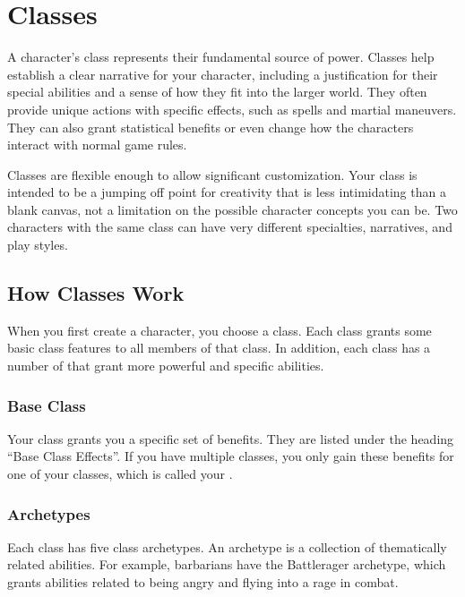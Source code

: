 \chapter{Classes}\label{Classes}

    A character's class represents their fundamental source of power.
    Classes help establish a clear narrative for your character, including a justification for their special abilities and a sense of how they fit into the larger world.
    They often provide unique actions with specific effects, such as spells and martial maneuvers.
    They can also grant statistical benefits or even change how the characters interact with normal game rules.

    Classes are flexible enough to allow significant customization.
    Your class is intended to be a jumping off point for creativity that is less intimidating than a blank canvas, not a limitation on the possible character concepts you can be.
    Two characters with the same class can have very different specialties, narratives, and play styles.

\section{How Classes Work}
    When you first create a character, you choose a class.
    Each class grants some basic class features to all members of that class.
    In addition, each class has a number of  that grant more powerful and specific abilities.

    \subsection{Base Class}\label{Base Class}
        Your class grants you a specific set of benefits.
        They are listed under the heading ``Base Class Effects''.
        If you have multiple classes, you only gain these benefits for one of your classes, which is called your .

    \subsection{Archetypes}\label{Archetypes}
        Each class has five class archetypes.
        An archetype is a collection of thematically related abilities.
        For example, barbarians have the Battlerager archetype, which grants abilities related to being angry and flying into a rage in combat.

